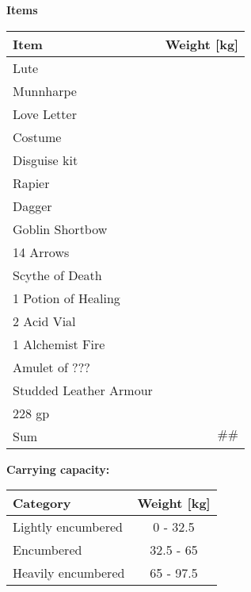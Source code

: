\documentclass[11pt]{article}
\begin{document}
\clearpage

	\begin{center}
{\LARGE \textbf{Items}}
	\end{center}

	\begin{tabularx}{\textwidth}{X|r}
Item & Weight [kg] \\
\hline
Lute 							&  	\\
Munnharpe						&	\\
Love Letter						&	\\
Costume							&	\\
Disguise kit					&	\\
Rapier							&	\\
Dagger							&	\\
Goblin Shortbow					&	\\
14 Arrows						&	\\
Scythe of Death					&	\\
1 Potion of Healing				&	\\
2 Acid Vial						&	\\
1 Alchemist Fire				&	\\
Amulet of ???					&	\\
Studded Leather Armour			&	\\
228 gp 							& 	\\
\hline
Sum 							& $\#\#$
	\end{tabularx}

\vspace{10mm}

\textbf{Carrying capacity:} \\

	\begin{tabular}{l|c}
Category & Weight [kg] \\
\hline
Lightly encumbered 	& 0 - 32.5 	\\
Encumbered 			& 32.5 - 65 \\
Heavily encumbered	& 65 - 97.5
	\end{tabular}
\end{document}
